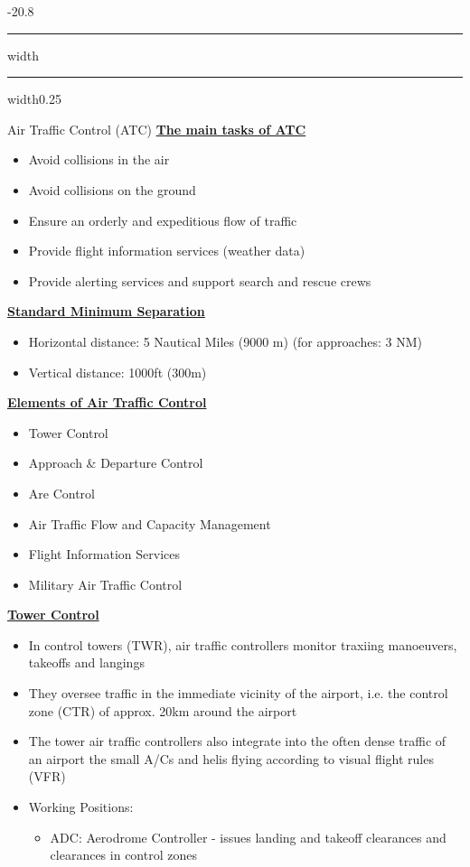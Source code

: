 \documentclass[9pt, landscape, fleqn]{scrartcl}
\makeatletter
\renewcommand{\section}{\@startsection{section}{1}{0mm}%
{-2\baselineskip}{0.8\baselineskip}%
{\hrule depth 0.2pt width\columnwidth\hrule depth1.5pt
width0.25\columnwidth\vspace*{1.2em}\Large\bfseries\rmfamily}}
\makeatother
\begin{document}
\begin{multicols*}{3}
\section{Air Traffic Control (ATC)}
\underline{\textbf{The main tasks of ATC}}
\begin{itemize}
    \item Avoid collisions in the air 
    \item Avoid collisions on the ground 
    \item Ensure an orderly and expeditious flow of traffic 
    \item Provide flight information services (weather data)
    \item Provide alerting services and support search and rescue crews 
\end{itemize}
\underline{\textbf{Standard Minimum Separation}}
\begin{itemize}
    \item Horizontal distance: 5 Nautical Miles (9000 m) (for approaches: 3 NM)
    \item Vertical distance: 1000ft (300m)
\end{itemize}
\underline{\textbf{Elements of Air Traffic Control}}
\begin{itemize}
    \item Tower Control 
    \item Approach \& Departure Control 
    \item Are Control
    \item Air Traffic Flow and Capacity Management
    \item Flight Information Services 
    \item Military Air Traffic Control 
\end{itemize}
\underline{\textbf{Tower Control}}
\begin{itemize}
    \item In control towers (TWR), air traffic controllers monitor traxiing manoeuvers, takeoffs and langings 
    \item They oversee traffic in the immediate vicinity of the airport, i.e. the control zone (CTR) of approx. 20km around the airport 
    \item The tower air traffic controllers also integrate into the often dense traffic of an airport the small A/Cs and helis flying according to visual flight rules (VFR)
    \item Working Positions: 
    \begin{itemize}
        \item ADC: Aerodrome Controller - issues landing and takeoff clearances and clearances in control zones

\end{itemize}
\end{itemize}
\end{multicols*}
\end{document}
